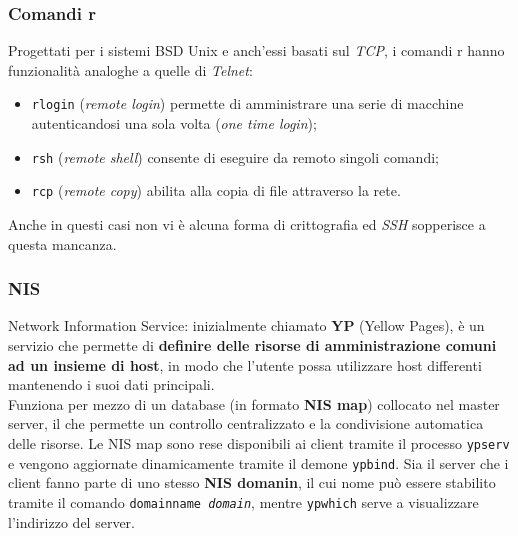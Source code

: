 \documentclass[a4paper,11pt]{article}
\def\code#1{\texttt{#1}}
\begin{document}
\subsubsection{Comandi r}
Progettati per i sistemi BSD Unix e anch'essi basati sul \textit{TCP}, i comandi r hanno funzionalità analoghe a quelle di \textit{Telnet}:
\begin{itemize}
\item \code{rlogin} (\textit{remote login}) permette di amministrare una serie di macchine autenticandosi una sola volta (\textit{one time login}); 
\item \code{rsh} (\textit{remote shell}) consente di eseguire da remoto singoli comandi;
\item \code{rcp} (\textit{remote copy}) abilita alla copia di file attraverso la rete. 
\end{itemize}
Anche in questi casi non vi è alcuna forma di crittografia ed \textit{SSH} sopperisce a questa mancanza.

\subsubsection{NIS}
Network Information Service: inizialmente chiamato \textbf{YP} (Yellow Pages), è un servizio che permette di \textbf{definire delle risorse di amministrazione comuni ad un insieme di host}, in modo che l'utente possa utilizzare host differenti mantenendo i suoi dati principali.\\ Funziona per mezzo di un database (in formato \textbf{NIS map}) collocato nel master server, il che permette un controllo centralizzato e la condivisione automatica delle risorse. Le NIS map sono rese disponibili ai client tramite il processo \code{ypserv} e vengono aggiornate dinamicamente tramite il demone \code{ypbind}. Sia il server che i client fanno parte di uno stesso \textbf{NIS domanin}, il cui nome può essere stabilito tramite il comando \code{domainname \textit{domain}}, mentre \code{ypwhich} serve a visualizzare l'indirizzo del server. 
\end{document}
